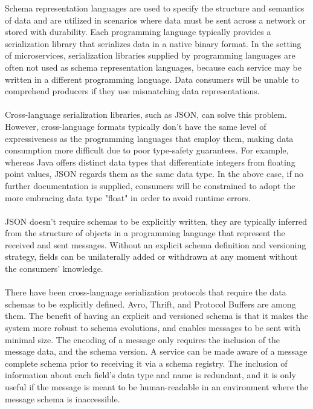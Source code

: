 Schema representation languages are used to specify the structure and semantics of data and are utilized in scenarios where data must be sent across a network or stored with durability.
Each programming language typically provides a serialization library that serializes data in a native binary format.
In the setting of microservices, serialization libraries supplied by programming languages are often not used as schema representation languages,
because each service may be written in a different programming language.
Data consumers will be unable to comprehend producers if they use mismatching data representations.

\paragraph{}

Cross-language serialization libraries, such as JSON, can solve this problem.
However, cross-language formats typically don't have the same level of expressiveness as the programming languages that employ them,
making data consumption more difficult due to poor type-safety guarantees.
For example, whereas Java offers distinct data types that differentiate integers from floating point values, JSON regards them as the same data type.
In the above case, if no further documentation is supplied, consumers will be constrained to adopt the more embracing data type "float" in order to avoid runtime errors.

\paragraph{}

JSON doesn't require schemas to be explicitly written, they are typically inferred from the structure of objects in a programming language that represent the received and sent messages.
Without an explicit schema definition and versioning strategy, fields can be unilaterally added or withdrawn at any moment without the consumers' knowledge.

\paragraph{}

There have been cross-language serialization protocols that require the data schemas to be explicitly defined.
Avro, Thrift, and Protocol Buffers \cite{8,9,10} are among them.
The benefit of having an explicit and versioned schema is that it makes the system more robust to schema evolutions, and
enables messages to be sent with minimal size.
The encoding of a message only requires the inclusion of the message data, and the schema version.
A service can be made aware of a message complete schema prior to receiving it via a schema registry.
The inclusion of information about each field's data type and name is redundant,
and it is only useful if the message is meant to be human-readable in an environment where the message schema is inaccessible.

